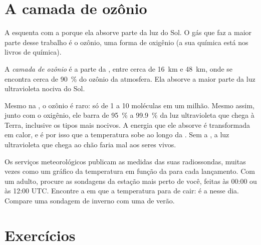 \section{A camada de ozônio}

A  esquenta com a  porque ela absorve parte da luz do
Sol. O gás que faz a maior parte desse trabalho é o ozônio, uma forma de
oxigênio (a sua química está nos livros de química).

\begin{definition}\label{def:g8:the-atmosphere:ozone-layer}
A \emph{camada de ozônio} é a parte da
, entre cerca de \qty{16}{km} e \qty{48}{km}, onde se
encontra cerca de 90~\% do ozônio da atmosfera. Ela absorve a maior parte
da luz ultravioleta nociva do Sol.
\end{definition}

Mesmo na , o ozônio é raro: só de 1 a 10 moléculas em um
milhão. Mesmo assim, junto com o oxigênio, ele barra de 95~\% a 99.9~\%
da luz ultravioleta que chega à Terra, inclusive os tipos mais nocivos. A
energia que ele absorve é transformada em calor, e é por isso que a
temperatura sobe ao longo da . Sem a , a luz
ultravioleta que chega ao chão faria mal aos seres vivos.

\begin{inthefield}
Os serviços meteorológicos publicam as medidas das suas radiossondas,
muitas vezes como um gráfico da temperatura em função da  para
cada lançamento. Com um adulto, procure as sondagens da estação mais perto
de você, feitas às 00:00 ou às 12:00 UTC. Encontre a  em que a
temperatura para de cair: é a  nesse dia. Compare uma sondagem
de inverno com uma de verão.
\end{inthefield}

\section{Exercícios}

